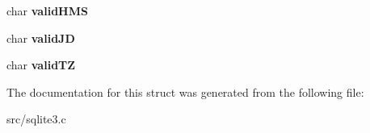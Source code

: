 \begin{DoxyCompactItemize}
\item 
\hypertarget{struct_date_time_aba26b32c6142cf6bfc09db3088b90add}{char {\bfseries valid\-H\-M\-S}}\label{struct_date_time_aba26b32c6142cf6bfc09db3088b90add}

\item 
\hypertarget{struct_date_time_a1962742892150a03dc5d302f43efbb04}{char {\bfseries valid\-J\-D}}\label{struct_date_time_a1962742892150a03dc5d302f43efbb04}

\item 
\hypertarget{struct_date_time_af3dfda2bdbb2183dc1b94f449701b81e}{char {\bfseries valid\-T\-Z}}\label{struct_date_time_af3dfda2bdbb2183dc1b94f449701b81e}

\end{DoxyCompactItemize}


The documentation for this struct was generated from the following file\-:\begin{DoxyCompactItemize}
\item 
src/sqlite3.\-c\end{DoxyCompactItemize}
